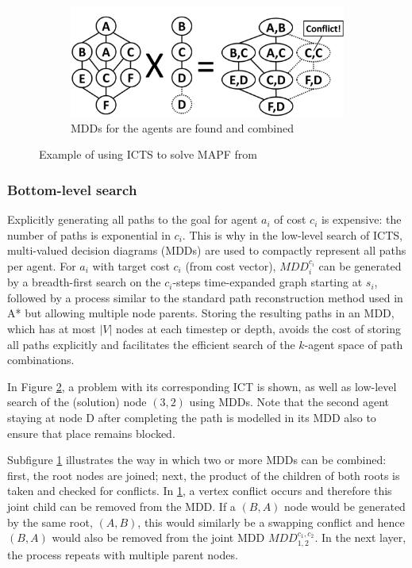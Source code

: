\documentclass[english]{article}
\begin{document}
\begin{figure}[b]
\begin{subfigure}{0.4\textwidth}
		\centering
		\includegraphics[width=\linewidth]{img/mdds}
		\caption{MDDs for the agents are found and combined}
		\label{fig:mdds}
	\end{subfigure}

	\caption{Example of using ICTS to solve MAPF from \cite{sharon2011}}
	\label{fig:bottom}
\end{figure}
	\subsubsection{Bottom-level search}
	Explicitly generating all paths to the goal for agent $a_i$ of cost $c_i$ is expensive: the number of paths is exponential in $c_i$. This is why in the low-level search of ICTS, multi-valued decision diagrams (MDDs) are used to compactly represent all paths per agent. For $a_i$ with target cost $c_i$ (from cost vector), $MDD_i^{c_i}$ can be generated by a breadth-first search on the $c_i$-steps time-expanded graph starting at $s_i$, followed by a process similar to the standard path reconstruction method used in A* but allowing multiple node parents. Storing the resulting paths in an MDD, which has at most $|V|$ nodes at each timestep or depth, avoids the cost of storing all paths explicitly and facilitates the efficient search of the $k$-agent space of path combinations.
	
	In Figure \ref{fig:bottom}, a problem with its corresponding ICT is shown, as well as low-level search of the (solution) node $(3,2)$ using MDDs. Note that the second agent staying at node D after completing the path is modelled in its MDD also to ensure that place remains blocked.
	
	Subfigure \ref{fig:mdds} illustrates the way in which two or more MDDs can be combined: first, the root nodes are joined; next, the product of the children of both roots is taken and checked for conflicts. In \ref{fig:mdds}, a vertex conflict occurs and therefore this joint child can be removed from the MDD. If a $(B,A)$ node would be generated by the same root, $(A,B)$, this would similarly be a swapping conflict and hence $(B,A)$ would also be removed from the joint MDD $MDD_{1,2}^{c_1,c_2}$. In the next layer, the process repeats with multiple parent nodes.
	
\end{document}
